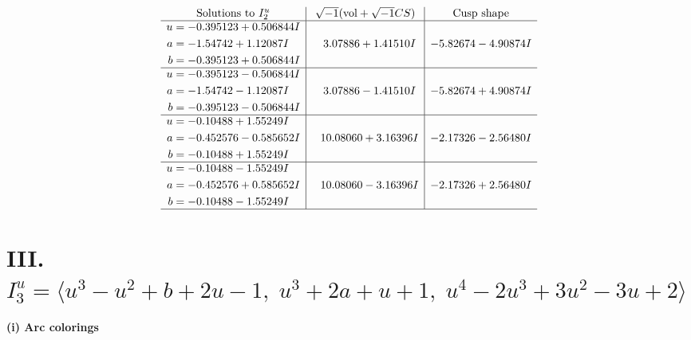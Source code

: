 \documentclass[1p]{elsarticle_modified}
\theoremstyle{definition}
\newcommand{\I}{\sqrt{-1}}
\begin{document}
$$\begin{array}{c|c|c}  
\text{Solutions to }I^u_{2}& \I (\text{vol} + \sqrt{-1}CS) & \text{Cusp shape}\\
 \hline 
\begin{aligned}
u &= -0.395123 + 0.506844 I \\
a &= -1.54742 + 1.12087 I \\
b &= -0.395123 + 0.506844 I\end{aligned}
 & \phantom{-}3.07886 + 1.41510 I & -5.82674 - 4.90874 I \\ \hline\begin{aligned}
u &= -0.395123 - 0.506844 I \\
a &= -1.54742 - 1.12087 I \\
b &= -0.395123 - 0.506844 I\end{aligned}
 & \phantom{-}3.07886 - 1.41510 I & -5.82674 + 4.90874 I \\ \hline\begin{aligned}
u &= -0.10488 + 1.55249 I \\
a &= -0.452576 - 0.585652 I \\
b &= -0.10488 + 1.55249 I\end{aligned}
 & \phantom{-}10.08060 + 3.16396 I & -2.17326 - 2.56480 I \\ \hline\begin{aligned}
u &= -0.10488 - 1.55249 I \\
a &= -0.452576 + 0.585652 I \\
b &= -0.10488 - 1.55249 I\end{aligned}
 & \phantom{-}10.08060 - 3.16396 I & -2.17326 + 2.56480 I\\
 \hline 
 \end{array}$$\newpage\newpage\renewcommand{\arraystretch}{1}
\centering \section*{III. $I^u_{3}= \langle u^3- u^2+b+2 u-1,\;u^3+2 a+u+1,\;u^4-2 u^3+3 u^2-3 u+2 \rangle$}
\flushleft \textbf{(i) Arc colorings}\\
\end{document}
